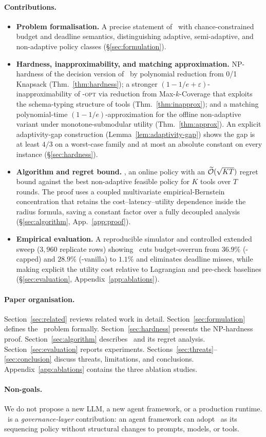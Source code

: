 \paragraph{Contributions.}
\begin{itemize}
  \item[(C1)] \textbf{Problem formalisation.} A precise statement of
    \CBSLAO~with chance-constrained budget and deadline semantics,
    distinguishing adaptive, semi-adaptive, and non-adaptive policy
    classes (\S\ref{sec:formulation}).
  \item[(C2)] \textbf{Hardness, inapproximability, and matching
    approximation.} NP-hardness of the decision version of \CBSLAO~by
    polynomial reduction from 0/1 Knapsack
    (Thm.~\ref{thm:hardness}); a stronger
    $(1 - 1/e + \varepsilon)$-inapproximability of \CBSLAO-\textsc{opt}
    via reduction from Max-$k$-Coverage that exploits the schema-typing
    structure of tools (Thm.~\ref{thm:inapprox}); and a matching
    polynomial-time $(1-1/e)$-approximation for the offline
    non-adaptive variant under monotone-submodular utility
    (Thm.~\ref{thm:approx}). An explicit adaptivity-gap construction
    (Lemma~\ref{lem:adaptivity-gap}) shows the gap is at least $4/3$
    on a worst-case family and at most an absolute constant on every
    instance (\S\ref{sec:hardness}).
  \item[(C3)] \textbf{Algorithm and regret bound.} \CBUC, an online
    policy with an $\widetilde{\mathcal{O}}(\sqrt{KT})$ regret bound against the best
    non-adaptive feasible policy for $K$ tools over $T$ rounds. The
    proof uses a coupled multivariate empirical-Bernstein concentration
    that retains the cost--latency--utility dependence inside the
    radius formula, saving a constant factor over a fully decoupled
    analysis (\S\ref{sec:algorithm}, App.~\ref{app:proof}).
  \item[(C4)] \textbf{Empirical evaluation.} A reproducible simulator
    and controlled extended sweep ($3{,}960$ replicate rows) showing
    \CBUC~cuts budget-overrun from $36.9\%$ (\ReAct-capped) and
    $28.9\%$ (\BwK-vanilla) to $1.1\%$ and eliminates deadline misses,
    while making explicit the utility cost relative to Lagrangian and
    pre-check baselines (\S\ref{sec:evaluation},
    Appendix~\ref{app:ablations}).
\end{itemize}

\paragraph{Paper organisation.}
Section~\ref{sec:related} reviews related work in detail.
Section~\ref{sec:formulation} defines the \CBSLAO~problem formally.
Section~\ref{sec:hardness} presents the NP-hardness proof.
Section~\ref{sec:algorithm} describes \CBUC~and its regret analysis.
Section~\ref{sec:evaluation} reports experiments.
Sections~\ref{sec:threats}--\ref{sec:conclusion} discuss threats,
limitations, and conclusions.
Appendix~\ref{app:ablations} contains the three ablation studies.

\paragraph{Non-goals.}
We do not propose a new LLM, a new agent framework, or a production
runtime. \CBSLAO~is a \emph{governance-layer} contribution: an agent
framework can adopt \CBUC~as its sequencing policy without structural
changes to prompts, models, or tools.
